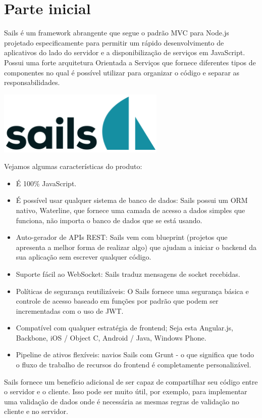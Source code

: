 \documentclass[a4paper,11pt]{article}
\begin{document}
\section{Parte inicial}
Sails é um framework abrangente que segue o padrão MVC para Node.js projetado especificamente para permitir um rápido desenvolvimento de aplicativos do lado do servidor e a disponibilização de serviços em JavaScript. Possui uma forte arquitetura Orientada a Serviços que fornece diferentes tipos de componentes no qual é possível utilizar para organizar o código e separar as responsabilidades. 
\begin{center} 
\includegraphics[width=0.6\textwidth]{sails.png} 
\end{center}
Vejamos algumas características do produto:
\begin{itemize}
  \item É 100\% JavaScript.
  \item É possível usar qualquer sistema de banco de dados: Sails possui um ORM nativo, Waterline, 
  que fornece uma camada de acesso a dados simples que funciona, não importa o banco de dados 
  que se está usando.
  \item Auto-gerador de APIs REST: Sails vem com blueprint (projetos que apresenta a melhor forma de realizar algo) que ajudam a iniciar o backend da 
  sua aplicação sem escrever qualquer código.
  \item Suporte fácil ao WebSocket: Sails traduz mensagens de socket recebidas.
  \item Políticas de segurança reutilizáveis: O Sails fornece uma segurança básica e controle de acesso baseado em funções por padrão que podem ser incrementadas com o uso de JWT.
  \item Compatível com qualquer estratégia de frontend; Seja esta Angular.js, Backbone, iOS / Object C, Android / Java, Windows Phone.
  \item Pipeline de ativos flexíveis: navios Sails com Grunt - o que significa que todo o fluxo de trabalho de recursos do frontend é completamente personalizável.
\end{itemize}
Sails fornece um benefício adicional de ser capaz de compartilhar seu código entre o servidor e o cliente. Isso pode ser muito útil, por exemplo, para implementar uma validação de dados onde é necessária as mesmas regras de validação no cliente e no servidor.
\end{document}
